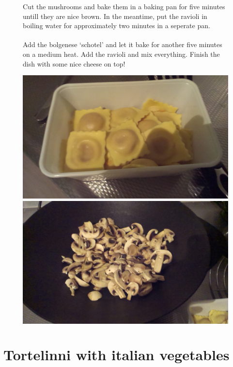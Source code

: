 \documentclass[a4paper,12pt]{report}
\begin{document}
\begin{figure}[h]

\begin{minipage}{0.6\textwidth}
Cut the mushrooms and bake them in a baking pan for five minutes untill they are nice brown. In the meantime, put the ravioli in boiling water for approximately two minutes in a seperate pan.  \\
\\
Add the bolgenese `schotel' and let it bake for another five minutes on a medium heat. Add the ravioli and mix everything. Finish the dish with some nice cheese on top!

\end{minipage}
\begin{minipage}{0.35\textwidth}
	\includegraphics[scale=0.065]{Images/ravioli.jpg}
	\includegraphics[scale=0.065]{Images/mushroom.jpg}
\end{minipage}
\end{figure}


\chapter{Tortelinni with italian vegetables}
\end{document}
